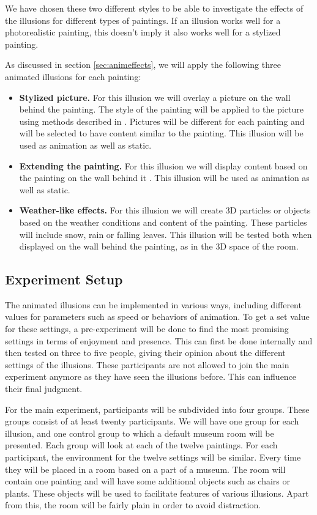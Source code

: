 \documentclass[a4paper]{article}
\begin{document}
We have chosen these two different styles to be able to investigate the effects of the illusions for different types of paintings. If an illusion works well for a photorealistic painting, this doesn't imply it also works well for a stylized painting.

As discussed in section \ref{sec:animeffects}, we will apply the following three animated illusions for each painting:

\begin{itemize}
\item \textbf{Stylized picture.} For this illusion we will overlay a picture on the wall behind the painting. The style of the painting will be applied to the picture using methods described in \cite{gatys}. Pictures will be different for each painting and will be selected to have content similar to the painting. This illusion will be used as animation as well as static.
\item \textbf{Extending the painting.} For this illusion we will display content based on the painting on the wall behind it \cite{inpainting}. This illusion will be used as animation as well as static.
\item \textbf{Weather-like effects.} For this illusion we will create 3D particles or objects based on the weather conditions and content of the painting. These particles will include snow, rain or falling leaves. This illusion will be tested both when displayed on the wall behind the painting, as in the 3D space of the room.
\end{itemize}

\subsection{Experiment Setup}

The animated illusions can be implemented in various ways, including different values for parameters such as speed or behaviors of animation. To get a set value for these settings, a pre-experiment will be done to find the most promising settings in terms of enjoyment and presence. This can first be done internally and then tested on three to five people, giving their opinion about the different settings of the illusions. These participants are not allowed to join the main experiment anymore as they have seen the illusions before. This can influence their final judgment.

For the main experiment, participants will be subdivided into four groups. These groups consist of at least twenty participants. We will have one group for each illusion, and one control group to which a default museum room will be presented. Each group will look at each of the twelve paintings. 
For each participant, the environment for the twelve settings will be similar. Every time they will be placed in a room based on a part of a museum. The room will contain one painting and will have some additional objects such as chairs or plants. These objects will be used to facilitate features of various illusions. Apart from this, the room will be fairly plain in order to avoid distraction.
\end{document}
